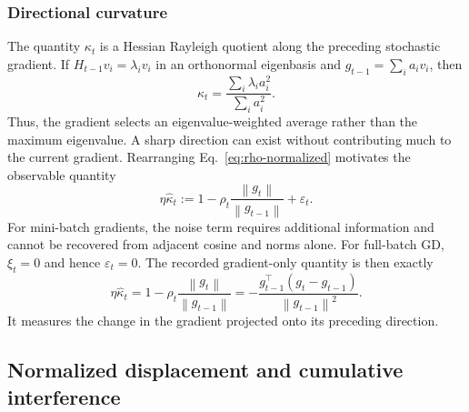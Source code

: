 \documentclass[11pt]{article}
\newcommand{\norm}[1]{\left\lVert#1\right\rVert}
\begin{document}



\subsubsection{Directional curvature}

The quantity $\kappa_t$ is a Hessian Rayleigh quotient along the preceding
stochastic gradient. If $H_{t-1}v_i=\lambda_i v_i$ in an orthonormal eigenbasis
and $g_{t-1}=\sum_i a_i v_i$, then
\begin{equation}
  \kappa_t=\frac{\sum_i\lambda_i a_i^2}{\sum_i a_i^2}.
  \label{eq:rayleigh}
\end{equation}
Thus, the gradient selects an eigenvalue-weighted average rather than the
maximum eigenvalue. A sharp direction can exist without contributing much to
the current gradient. Rearranging Eq.~\eqref{eq:rho-normalized} motivates the observable quantity
\begin{equation}
  \eta\widehat\kappa_t
  :=1-\rho_t\frac{\norm{g_t}}{\norm{g_{t-1}}}+\varepsilon_t.
  \label{eq:kappa-estimate}
\end{equation}
For mini-batch gradients, the noise term requires additional information and cannot
be recovered from adjacent cosine and norms alone. For full-batch GD, $\xi_t=0$ and hence $\varepsilon_t=0$. The recorded
gradient-only quantity is then exactly
\begin{equation}
\eta\widehat\kappa_t
 =1-\rho_t\frac{\norm{g_t}}{\norm{g_{t-1}}}
 =-\frac{g_{t-1}^\top(g_t-g_{t-1})}{\norm{g_{t-1}}^2}.
\label{eq:gd-proxy}
\end{equation}
It measures the change in the gradient projected onto its preceding direction.

\subsection{Normalized displacement and cumulative interference}
\end{document}
